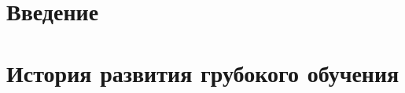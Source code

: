 \documentclass[a4paper, 12pt]{article}
\author{Еремеев Тимур 151}
\begin{document}
    \maketitle

    \section{Введение}    
    

    \section{История развития грубокого обучения}
    
\end{document}
